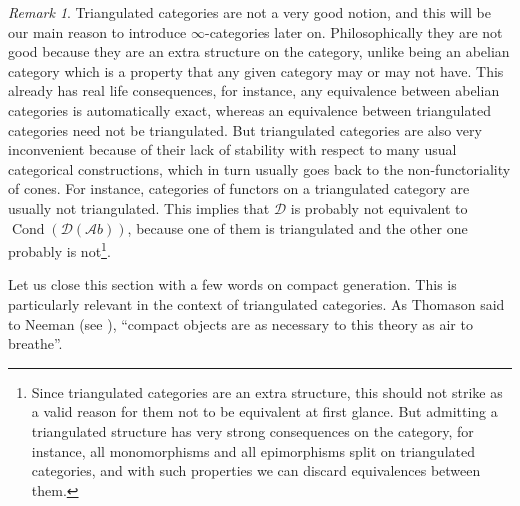 \documentclass[11pt,A4]{article}
\theoremstyle{plain}
\theoremstyle{definition}
\theoremstyle{remark}
\newtheorem{rem}[thm]{Remark}
\newcommand{\1}{\mathbbm{1}}
\newcommand{\Ab}{\mathscr{A}b}
\newcommand{\D}{\mathscr{D}}
\DeclareMathOperator{\Cond}{Cond}
\begin{document}
\begin{rem}
    Triangulated categories are not a very good notion, and this will be our main reason to introduce $\infty$-categories later on.
    Philosophically they are not good because they are an extra structure on the category, unlike being an abelian category which is a property that any given category may or may not have.
    This already has real life consequences, for instance, any equivalence between abelian categories is automatically exact, whereas an equivalence between triangulated categories need not be triangulated.
    But triangulated categories are also very inconvenient because of their lack of stability with respect to many usual categorical constructions, which in turn usually goes back to the non-functoriality of cones.
    For instance, categories of functors on a triangulated category are usually not triangulated.
    This implies that $\D$ is probably not equivalent to $\Cond(\D(\Ab))$, because one of them is triangulated and the other one probably is not\footnote{Since triangulated categories are an extra structure, this should not strike as a valid reason for them not to be equivalent at first glance. But admitting a triangulated structure has very strong consequences on the category, for instance, all monomorphisms and all epimorphisms split on triangulated categories, and with such properties we can discard equivalences between them.}.
\end{rem}

Let us close this section with a few words on compact generation.
This is particularly relevant in the context of triangulated categories.
As Thomason said to Neeman (see \cite{nee01}), ``compact objects are as necessary to this theory as air to breathe''.
\end{document}
